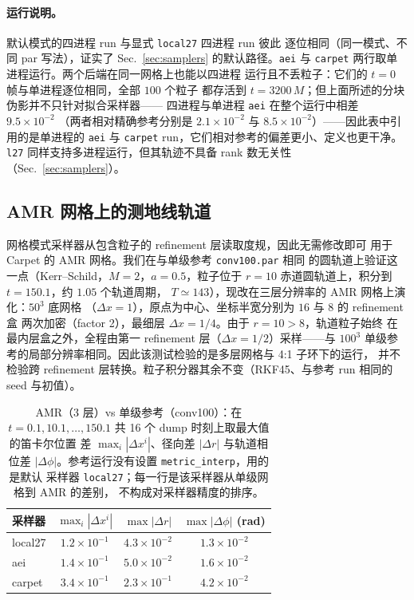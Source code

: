 \documentclass[11pt,UTF8]{ctexart}
\begin{document}
\paragraph{运行说明。}
默认模式的四进程 run 与显式 \texttt{local27} 四进程 run 彼此
逐位相同（同一模式、不同 par 写法），证实了
Sec.~\ref{sec:samplers} 的默认路径。\texttt{aei} 与
\texttt{carpet} 两行取单进程运行。两个后端在同一网格上也能以四进程
运行且不丢粒子：它们的 $t = 0$ 帧与单进程逐位相同，全部 $100$ 个粒子
都存活到 $t = 3200\,M$；但上面所述的分块伪影并不只针对拟合采样器——
四进程与单进程 \texttt{aei} 在整个运行中相差 $9.5\times10^{-2}$
（两者相对精确参考分别是 $2.1\times10^{-2}$ 与
$8.5\times10^{-2}$）——因此表中引用的是单进程的 \texttt{aei} 与
\texttt{carpet} run，它们相对参考的偏差更小、定义也更干净。\texttt{l27}
同样支持多进程运行，但其轨迹不具备 rank 数无关性（Sec.~\ref{sec:samplers}）。

\subsection{AMR 网格上的测地线轨道}\label{sec:amr-orbits}

网格模式采样器从包含粒子的 refinement 层读取度规，因此无需修改即可
用于 Carpet 的 AMR 网格。我们在与单级参考 \texttt{conv100.par} 相同
的圆轨道上验证这一点（Kerr--Schild，$M=2$，$a=0.5$，粒子位于
$r=10$ 赤道圆轨道上，积分到 $t=150.1$，约 $1.05$ 个轨道周期，
$T\simeq 143$），现改在三层分辨率的 AMR 网格上演化：$50^3$ 底网格
（$\Delta x=1$），原点为中心、坐标半宽分别为 $16$ 与 $8$ 的 refinement 盒
两次加密（factor 2），最细层 $\Delta x=1/4$。由于 $r=10>8$，轨道粒子始终
在最内层盒之外，全程由第一 refinement 层（$\Delta x=1/2$）采样——与 $100^3$
单级参考的局部分辨率相同。因此该测试检验的是多层网格与 4:1 子环下的运行，
并不检验跨 refinement 层转换。粒子积分器其余不变（RKF45、与参考 run 相同的
seed 与初值）。

\begin{table}[h]
\centering
\caption{AMR（3 层）vs 单级参考（conv100）：在
$t=0.1,10.1,\ldots,150.1$ 共 16 个 dump 时刻上取最大值的笛卡尔位置
差 $\max_i|\Delta x^i|$、径向差 $|\Delta r|$ 与轨道相位差
$|\Delta\phi|$。参考运行没有设置 \texttt{metric\_interp}，用的是默认
采样器 \texttt{local27}；每一行是该采样器从单级网格到 AMR 的差别，
不构成对采样器精度的排序。}\label{tab:amr-orbits}
\begin{tabular}{lccc}
\toprule
采样器 & $\max_i|\Delta x^i|$ & $\max|\Delta r|$ & $\max|\Delta\phi|$ (rad) \\
\midrule
local27         & $1.2\times10^{-1}$ & $4.3\times10^{-2}$ & $1.3\times10^{-2}$ \\
aei             & $1.4\times10^{-1}$ & $5.0\times10^{-2}$ & $1.6\times10^{-2}$ \\
carpet          & $3.4\times10^{-1}$ & $2.3\times10^{-1}$ & $4.2\times10^{-2}$ \\
\bottomrule
\end{tabular}
\end{table}
\end{document}
